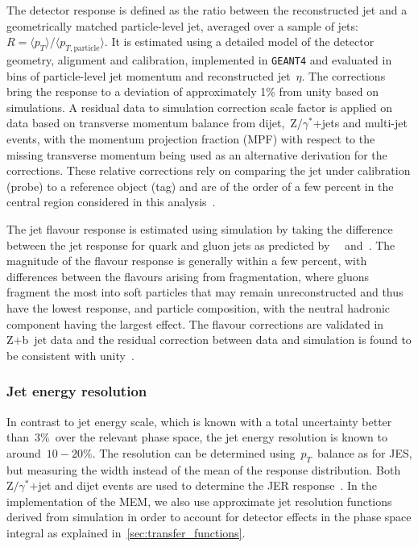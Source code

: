 The detector response is defined as the ratio between the reconstructed jet and a geometrically matched particle-level jet, averaged over a sample of jets:~$R = \langle p_T \rangle / \langle p_{T,\mathrm{particle}} \rangle$. It is estimated using a detailed model of the detector geometry, alignment and calibration, implemented in \texttt{GEANT4} and evaluated in bins of particle-level jet momentum and reconstructed jet~$\eta$. The corrections bring the response to a deviation of approximately 1\% from unity based on simulations. A residual data to simulation correction scale factor is applied on data based on transverse momentum balance from dijet,~$\mathrm{Z}/\gamma^*$+jets and multi-jet events, with the momentum projection fraction (MPF) with respect to the missing transverse momentum being used as an alternative derivation for the corrections. These relative corrections rely on comparing the jet under calibration (probe) to a reference object (tag) and are of the order of a few percent in the central region considered in this analysis~\cite{Chatrchyan:2011ds,cms_jec_2017}.

The jet flavour response is estimated using simulation by taking the difference between the jet response for quark and gluon jets as predicted by ~\pythia~and~\herwig. The magnitude of the flavour response is generally within a few percent, with differences between the flavours arising from fragmentation, where gluons fragment the most into soft particles that may remain unreconstructed and thus have the lowest response, and particle composition, with the neutral hadronic component having the largest effect. The flavour corrections are validated in Z+b~jet data and the residual correction between data and simulation is found to be consistent with unity~\cite{Chatrchyan:2011ds}.

\subsubsection{Jet energy resolution}
In contrast to jet energy scale, which is known with a total uncertainty better than~$3\%$~over the relevant phase space, the jet energy resolution is known to around~$10-20\%$. The resolution can be determined using~$p_T$~balance as for JES, but measuring the width instead of the mean of the response distribution. Both~$\mathrm{Z}/\gamma^*$+jet and dijet events are used to determine the JER response~\cite{Chatrchyan:2011ds}. In the implementation of the MEM, we also use approximate jet resolution functions derived from simulation in order to account for detector effects in the phase space integral as explained in~\cref{sec:transfer_functions}.

